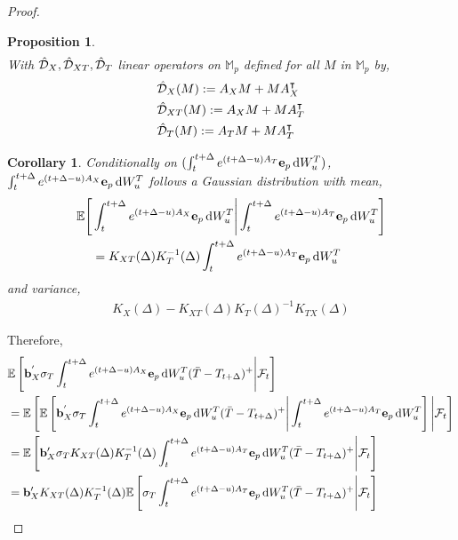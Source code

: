 \documentclass[10pt,a4paper,reqno]{amsart}
\newtheorem{corollary}[theorem]{Corollary}
\newtheorem{proposition}[theorem]{Proposition}
\theoremstyle{example}
\newcommand*\D{\mathop{}\!\textnormal{d}}
\begin{document}
\begin{proof}
\begin{proposition}
\begin{align}
   \end{align}
   With $\Hat{\mathcal{D}}_{X},\Hat{\mathcal{D}}_{XT},\Hat{\mathcal{D}}_{T}$ linear operators on $\mathbb{M}_p$ defined for all $M$ in $\mathbb{M}_p$ by,
   \begin{align}
       &\Hat{\mathcal{D}}_{X}(M):=A_XM+MA_X^\intercal\nonumber\\
       &\Hat{\mathcal{D}}_{XT}(M):=A_XM+MA_T^\intercal\nonumber\\
       &\Hat{\mathcal{D}}_{T}(M):=A_TM+MA_T^\intercal\nonumber
   \end{align}
\end{proposition}
\begin{corollary} Conditionally on $(\int_t^{t+\Delta} e^{(t+\Delta-u)A_T}\textbf{e}_p\D W_u^T)$, $\int_t^{t+\Delta} e^{(t+\Delta-u)A_X}\textbf{e}_p\D W_u^T$ follows a Gaussian distribution with mean, 
    \begin{align}
        \mathbb{E}\Bigg[&\int_t^{t+\Delta} e^{(t+\Delta-u)A_X}\textbf{e}_p\D W_u^T\Bigg|\int_t^{t+\Delta} e^{(t+\Delta-u)A_T}\textbf{e}_p\D W_u^T\Bigg]\\
        &= K_{XT}(\Delta)K_T^{-1}(\Delta)\int_t^{t+\Delta} e^{(t+\Delta-u)A_T}\textbf{e}_p\D W_u^T
    \end{align}
    and variance,
    \begin{align}
        K_X(\Delta) - K_{XT}(\Delta)K_{T}(\Delta)^{-1}K_{TX}(\Delta)\nonumber
    \end{align}
\end{corollary}
\noindent
Therefore,
\begin{align}
    &\mathbb{E}\left[\mathbf{b}_X^{'} \sigma_T \int_t^{t+\Delta} e^{(t+\Delta-u)A_X}\textbf{e}_p\D W_u^T(\Bar{T}-T_{t+\Delta})^+ \Bigg| \mathcal{F}_t\right]\nonumber\\
    &=
   \mathbb{E}\left[ \mathbb{E}\left[\mathbf{b}_X^{'} \sigma_T \int_t^{t+\Delta} e^{(t+\Delta-u)A_X}\textbf{e}_p\D W_u^T(\Bar{T}-T_{t+\Delta})^+ \Bigg| \int_t^{t+\Delta} e^{(t+\Delta-u)A_T}\textbf{e}_p\D W_u^T\right]\Bigg| \mathcal{F}_t\right]\nonumber\\
   &=\mathbb{E}\left[ \mathbf{b}_X'\sigma_T   K_{XT}(\Delta)K_T^{-1}(\Delta)\int_t^{t+\Delta} e^{(t+\Delta-u)A_T}\textbf{e}_p\D W_u^T(\Bar{T}-T_{t+\Delta})^+ \Bigg|\mathcal{F}_t\right]\nonumber\\
    &=\mathbf{b}_X'  K_{XT}(\Delta)K_T^{-1}(\Delta)\mathbb{E}\left[\sigma_T \int_t^{t+\Delta} e^{(t+\Delta-u)A_T}\textbf{e}_p\D W_u^T(\Bar{T}-T_{t+\Delta})^+ \Bigg|\mathcal{F}_t\right]\nonumber\\

\end{align}
\end{proof}
\end{document}
